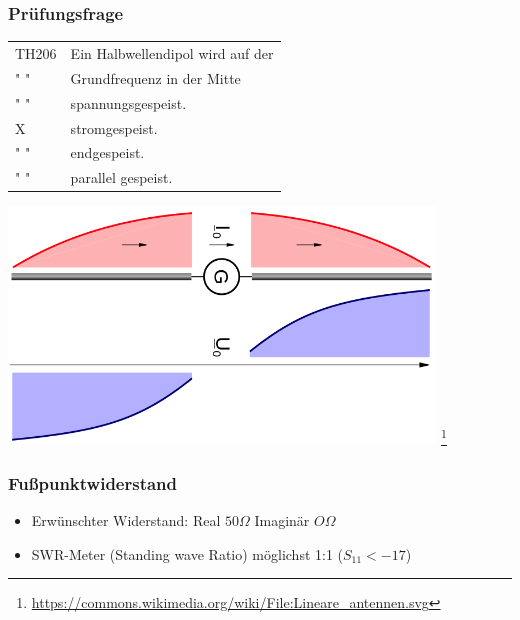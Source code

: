\begin{frame}
    \frametitle{Prüfungsfrage}

    \begin{center}
    \begin{tabular}{l||l}\hline
        TH206 & Ein Halbwellendipol wird auf der  \\
         " "  & Grundfrequenz in der Mitte \\ \hline\hline
         " " & spannungsgespeist.\\\hline
         X & stromgespeist. \\\hline
         " " & endgespeist. \\ \hline
         " " & parallel gespeist.\\\hline
    \end{tabular}
        \includegraphics[width=0.85\textwidth]{e11/DipolUI.png}
        \footnote{\tiny \url{https://commons.wikimedia.org/wiki/File:Lineare_antennen.svg}}
 	\end{center}
\end{frame}


\begin{frame}
    \frametitle{Fußpunktwiderstand}
    \begin{center}
	\begin{itemize}
		\item Erwünschter Widerstand: Real $50 \Omega$ Imaginär $O \Omega$
		\item SWR-Meter (Standing wave Ratio) möglichst 1:1 ($S_{11} < -17$)
    \end{itemize}
 	\end{center}
\end{frame}

